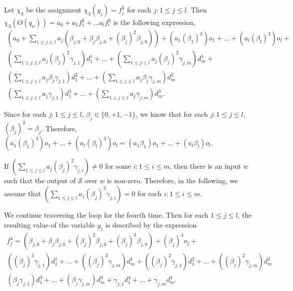 \documentclass[11pt]{article}
\def\Ss{{\mathcal{S} }}
\begin{document}
Let $\chi_3$ be the assignment $\chi_3(y_j)=f^3_j$ for each $j: 1\le j \le l$.
Then $\chi_3(O(q_n)) = a_0+ a_1 f^3_1 + \dots a_l f^3_l$ is the following expression,
\[
\begin{array}{l}
(a_0 + \sum \limits_{1 \le j \le l} a_j (\beta_{j,0} + \beta_{j} \beta_{j,0} + (\beta_j)^2 \beta_{j,0})) +  (a_1 (\beta_1)^3) o_1 + \dots + (a_l (\beta_l)^3) o_l + \\
 (\sum \limits_{1 \le j \le l} a_j (\beta_{j})^2\gamma_{j,1}) d^1_1 + \dots + (\sum \limits_{1 \le j \le l} a_j (\beta_{j})^2\gamma_{j,m}) d^1_m + \\
(\sum \limits_{1 \le j \le l} a_j \beta_j \gamma_{j,1}) d^2_1 + \dots + (\sum \limits_{1 \le j \le l} a_j \beta_j \gamma_{j,m}) d^2_m \\
(\sum \limits_{1 \le j \le l} a_j \gamma_{j,1}) d^3_1 + \dots + (\sum \limits_{1 \le j \le l} a_j \gamma_{j,m}) d^3_m. 
\end{array}
\]

Since for each $j: 1 \le j \le l$, $\beta_j \in \{0,+1,-1\}$, we know that for each $j: 1 \le j \le l$, $(\beta_j)^3=\beta_j$. Therefore, $(a_1 (\beta_1)^3) o_1 + \dots + (a_l (\beta_l)^3) o_l = (a_1 \beta_1) o_1 + \dots + (a_l \beta_l) o_l$.

If $(\sum \limits_{1 \le j \le l} a_j (\beta_j)^2\gamma_{j,i}) \neq 0$ for some $i: 1 \le i \le m$, then there is an input $w$ such that the output of $\Ss$ over $w$ is non-zero. Therefore, in the following, we assume that $(\sum \limits_{1 \le j \le l} a_j (\beta_j)^2\gamma_{j,i}) = 0$ for each $i: 1 \le i \le m$.


We continue traversing the loop for the fourth time. Then for each $1 \le j \le l$, the resulting value of the variable $y_j$ is described by the expression 
\[
\begin{array}{l}
f^4_{j} = (\beta_{j,0} + \beta_{j} \beta_{j,0} + (\beta_j)^2 \beta_{j,0}+(\beta_j)^3 \beta_{j,0}) + (\beta_{j})^4 o_{j} +
\\
((\beta_{j})^3\gamma_{j,1}) d^1_1 +\dots + ((\beta_{j})^3 \gamma_{j,m}) d^1_m  + 
((\beta_{j})^2\gamma_{j,1}) d^2_1 +\dots + ((\beta_{j})^2 \gamma_{j,m}) d^2_m \\
(\beta_j \gamma_{j,1}) d^3_1 + \dots + (\beta_j \gamma_{j,m}) d^3_m + \gamma_{j,1} d^4_1 + \dots + \gamma_{j,m} d^4_m.
\end{array}
\]
\end{document}
